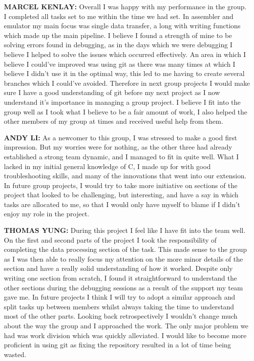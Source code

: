 \documentclass[11pt]{article}
\begin{document}
\textbf{MARCEL KENLAY:} Overall I was happy with my performance in the group. I completed all tasks set to me within the time we had set. In assembler and emulator my main focus was single data transfer, a long with writing functions which made up the main pipeline. I believe I found a strength of mine to be solving errors found in debugging, as in the days which we were debugging I believe I helped to solve the issues which occurred effectively. An area in which I believe I could’ve improved was using git as there was many times at which I believe I didn’t use it in the optimal way, this led to me having to create several branches which I could’ve avoided. Therefore in next group projects I would make sure I have a good understanding of git before my next project as I now understand it’s importance in managing a group project.  I believe I fit into the group well as I took what I believe to be a fair amount of work, I also helped the other members of my group at times and received useful help from them.\\\par

\textbf{ANDY LI:} As a newcomer to this group, I was stressed to make a good first impression. But my worries were for nothing, as the other three had already established a strong team dynamic, and I managed to fit in quite well. What I lacked in my initial general knowledge of C, I made up for with good troubleshooting skills, and many of the innovations that went into our extension.  In future group projects, I would try to take more initiative on sections of the project that looked to be challenging, but interesting, and have a say in which tasks are allocated to me, so that I would only have myself to blame if I didn't enjoy my role in the project.\\\par

\textbf{THOMAS YUNG:} During this project I feel like I have fit into the team well. On the first and second parts of the project I took the responsibility of completing the data processing section of the task. This made sense to the group as I was then able to really focus my attention on the more minor details of the section and have a really solid understanding of how it worked. Despite only writing one section from scratch, I found it straightforward to understand the other sections during the debugging sessions as a result of the support my team gave me. In future projects I think I will try to adopt a similar approach and split tasks up between members whilst always taking the time to understand most of the other parts. Looking back retrospectively I wouldn't change much about the way the group and I approached the work. The only major problem we had was work division which was quickly alleviated. I would like to become more proficient in using git as fixing the repository resulted in a lot of time being wasted.\par

\setlength{\leftskip}{0px}
\end{document}
